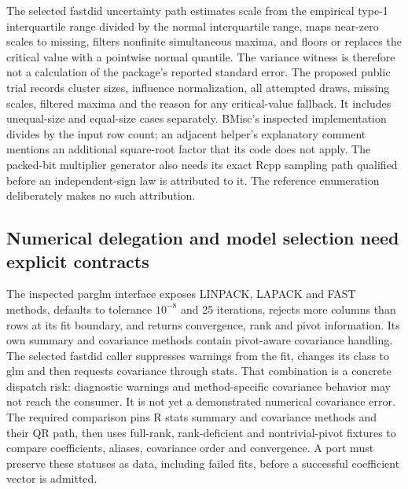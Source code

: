 The selected fastdid uncertainty path estimates scale from the empirical type-1 interquartile range divided by the normal interquartile range, maps near-zero scales to missing, filters nonfinite simultaneous maxima, and floors or replaces the critical value with a pointwise normal quantile. The variance witness is therefore not a calculation of the package's reported standard error. The proposed public trial records cluster sizes, influence normalization, all attempted draws, missing scales, filtered maxima and the reason for any critical-value fallback. It includes unequal-size and equal-size cases separately. BMisc's inspected implementation divides by the input row count; an adjacent helper's explanatory comment mentions an additional square-root factor that its code does not apply. The packed-bit multiplier generator also needs its exact Rcpp sampling path qualified before an independent-sign law is attributed to it. The reference enumeration deliberately makes no such attribution.~\citep{exec28_panel_delegates,exec29_panel_inference_sources,exec29_panel_inference_reference}

\subsection{Numerical delegation and model selection need explicit contracts}

The inspected parglm interface exposes LINPACK, LAPACK and FAST methods, defaults to tolerance $10^{-8}$ and 25 iterations, rejects more columns than rows at its fit boundary, and returns convergence, rank and pivot information. Its own summary and covariance methods contain pivot-aware covariance handling. The selected fastdid caller suppresses warnings from the fit, changes its class to glm and then requests covariance through stats. That combination is a concrete dispatch risk: diagnostic warnings and method-specific covariance behavior may not reach the consumer. It is not yet a demonstrated numerical covariance error. The required comparison pins R stats summary and covariance methods and their QR path, then uses full-rank, rank-deficient and nontrivial-pivot fixtures to compare coefficients, aliases, covariance order and convergence. A port must preserve these statuses as data, including failed fits, before a successful coefficient vector is admitted.~\citep{exec28_panel_estimator_sources,exec29_panel_inference_sources}

